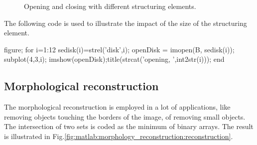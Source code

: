 \begin{figure}[htbp]
  \hfill
 \hfill
 \caption{Opening and closing with different structuring elements.}
 \label{fig:matlab:morphology_reconstruction:openclose}
\end{figure}


The following code is used to illustrate the impact of the size of the structuring element.
\begin{matlab}
% 
figure;
for i=1:12
    sedisk(i)=strel('disk',i);
    openDisk = imopen(B, sedisk(i));
    subplot(4,3,i); imshow(openDisk);title(strcat('opening, ',int2str(i)));
end
\end{matlab}

\subsection{Morphological reconstruction}
The morphological reconstruction is employed in a lot of applications, like removing objects touching the borders of the image, of removing small objects. The intersection of two sets is coded as the minimum of binary arrays. The result is illustrated in Fig.\ref{fig:matlab:morphology_reconstruction:reconstruction}.

